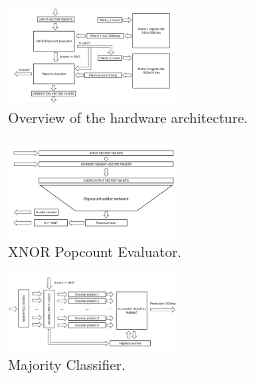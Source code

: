 \documentclass[conference]{IEEEtran}
\begin{document}
\begin{figure}[h]
    \centering
    \includegraphics[width=0.4\textwidth]{overview.pdf}
    \caption{Overview of the hardware architecture.}
    \label{fig:overview}
\end{figure}

\begin{figure}[h]
    \centering
    \includegraphics[width=0.4\textwidth]{Xnor_popcount.pdf}
    \caption{XNOR Popcount Evaluator.}
    \label{fig:xnor_popcount}
\end{figure}

\begin{figure}[h]
    \centering
    \includegraphics[width=0.4\textwidth]{majority_classifier.pdf}
    \caption{Majority Classifier.}
    \label{fig:majority_classifier}
\end{figure}





\end{document}
